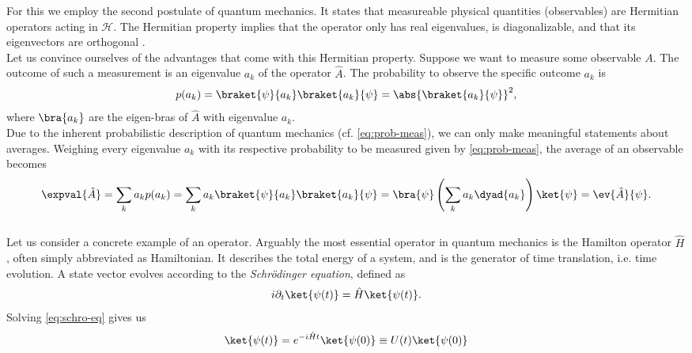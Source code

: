 For this we employ the second postulate of quantum mechanics. It states that measureable physical quantities
(observables) are Hermitian operators acting in $\mathcal{H}$. 
The Hermitian property implies that the operator only has real eigenvalues, is diagonalizable,
and that its eigenvectors are orthogonal \cite{messiahQuantumMechanics1991}.\\
Let us convince ourselves of the advantages that come with this Hermitian property.
Suppose we want to measure some observable $A$.
The outcome of such a measurement is an eigenvalue $a_k$ of the operator $\hat{A}$. The probability to observe the specific outcome $a_k$ is
\begin{align}\label{eq:prob-meas}
    p(a_k) = \braket{\psi}{a_k}\braket{a_k}{\psi} = \abs{\braket{a_k}{\psi}}^2,
\end{align}
where $\bra{a_k}$ are the eigen-bras of $\hat{A}$ with eigenvalue $a_k$.\\
Due to the inherent probabilistic description of quantum mechanics (cf. \cref{eq:prob-meas}), we can only make meaningful statements about averages.
Weighing every eigenvalue $a_k$ with its respective probability to be measured
given by \cref{eq:prob-meas}, the average of an observable becomes
\cite{nielsenQuantumComputationQuantum2010}
\begin{align}
    \expval{\hat{A}} = \sum\limits_k a_k p(a_k) = \sum\limits_k a_k \braket{\psi}{a_k}\braket{a_k}{\psi}
    = \bra{\psi} \left(\sum\limits_k a_k \dyad{a_k}\right) \ket{\psi} = \ev{\hat{A}}{\psi}.
\end{align}\\
Let us consider a concrete example of an operator.
Arguably the most essential operator in quantum mechanics is the Hamilton operator $\hat{H}$, often simply abbreviated as Hamiltonian.
It describes the total energy of a system, and is the generator of time translation, i.e. time evolution. A state vector evolves
according to the \emph{Schrödinger equation}, defined as
\cite{messiahQuantumMechanics1991}
\begin{align}\label{eq:schro-eq}
    i\partial_t \ket{\psi(t)} = \hat{H} \ket{\psi(t)}.
\end{align}
Solving \cref{eq:schro-eq} gives us
\begin{align}\label{eq:schro-sol}
    \ket{\psi(t)} = e^{-i\hat{H}t}\ket{\psi(0)} \equiv U(t)\ket{\psi(0)}
\end{align}
